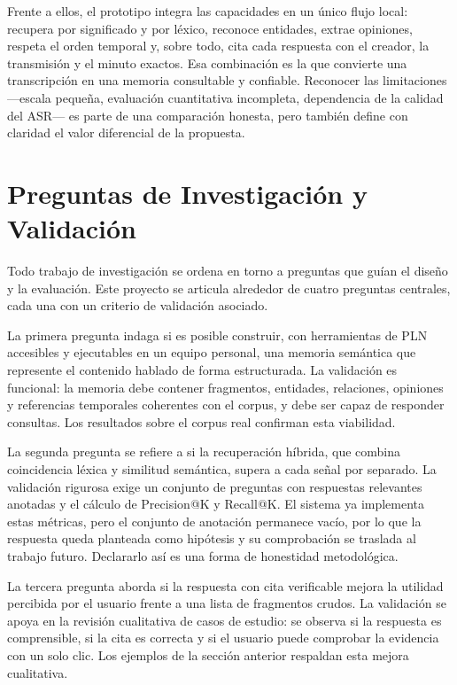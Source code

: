 \documentclass[12pt,a4paper]{article}
\begin{document}
Frente a ellos, el prototipo integra las capacidades en un único flujo local: recupera por significado y por léxico, reconoce entidades, extrae opiniones, respeta el orden temporal y, sobre todo, cita cada respuesta con el creador, la transmisión y el minuto exactos. Esa combinación es la que convierte una transcripción en una memoria consultable y confiable. Reconocer las limitaciones —escala pequeña, evaluación cuantitativa incompleta, dependencia de la calidad del ASR— es parte de una comparación honesta, pero también define con claridad el valor diferencial de la propuesta.



\section{Preguntas de Investigación y Validación}
\label{sec:preguntas}

Todo trabajo de investigación se ordena en torno a preguntas que guían el diseño y la evaluación. Este proyecto se articula alrededor de cuatro preguntas centrales, cada una con un criterio de validación asociado.

La primera pregunta indaga si es posible construir, con herramientas de PLN accesibles y ejecutables en un equipo personal, una memoria semántica que represente el contenido hablado de forma estructurada. La validación es funcional: la memoria debe contener fragmentos, entidades, relaciones, opiniones y referencias temporales coherentes con el corpus, y debe ser capaz de responder consultas. Los resultados sobre el corpus real confirman esta viabilidad.

La segunda pregunta se refiere a si la recuperación híbrida, que combina coincidencia léxica y similitud semántica, supera a cada señal por separado. La validación rigurosa exige un conjunto de preguntas con respuestas relevantes anotadas y el cálculo de Precision@K y Recall@K. El sistema ya implementa estas métricas, pero el conjunto de anotación permanece vacío, por lo que la respuesta queda planteada como hipótesis y su comprobación se traslada al trabajo futuro. Declararlo así es una forma de honestidad metodológica.

La tercera pregunta aborda si la respuesta con cita verificable mejora la utilidad percibida por el usuario frente a una lista de fragmentos crudos. La validación se apoya en la revisión cualitativa de casos de estudio: se observa si la respuesta es comprensible, si la cita es correcta y si el usuario puede comprobar la evidencia con un solo clic. Los ejemplos de la sección anterior respaldan esta mejora cualitativa.
\end{document}
